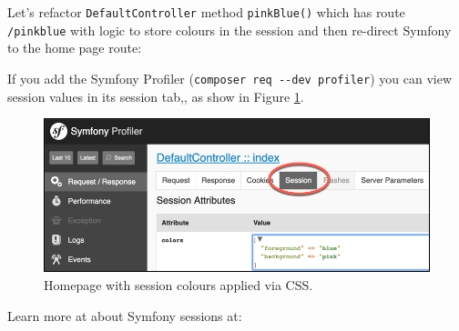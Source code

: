 \documentclass[a4paperpaper,openright]{book}
\newenvironment{Shaded}{}{}
\newcommand{\AnnotationTok}[1]{\textcolor[rgb]{0.38,0.63,0.69}{\textbf{\textit{#1}}}}
\newcommand{\CommentTok}[1]{\textcolor[rgb]{0.38,0.63,0.69}{\textit{#1}}}
\newcommand{\KeywordTok}[1]{\textcolor[rgb]{0.00,0.44,0.13}{\textbf{#1}}}
\newcommand{\NormalTok}[1]{#1}
\newcommand{\OtherTok}[1]{\textcolor[rgb]{0.00,0.44,0.13}{#1}}
\newcommand{\StringTok}[1]{\textcolor[rgb]{0.25,0.44,0.63}{#1}}
\begin{document}
Let's refactor \texttt{DefaultController} method \texttt{pinkBlue()}
which has route \texttt{/pinkblue} with logic to store colours in the
session and then re-direct Symfony to the home page route:

\begin{Shaded}
\end{Shaded}

If you add the Symfony Profiler
(\texttt{composer\ req\ -\/-dev\ profiler}) you can view session values
in its session tab,, as show in Figure \ref{session_profiler}.

\begin{figure}
\centering
\includegraphics{./tex2pdf.-65f13e14688ab55b/b55c386213380dcd9a550b90e2383b0bc3e55ffa.png}
\caption{Homepage with session colours applied via CSS.
\label{session_profiler}}
\end{figure}

Learn more at about Symfony sessions at:
\end{document}
